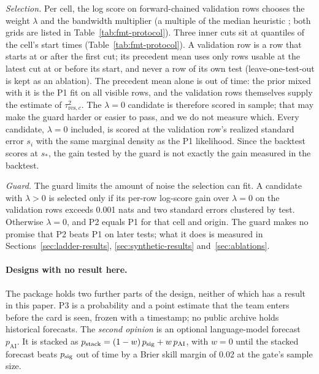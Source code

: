 \emph{Selection.} Per cell, the log score on forward-chained validation rows chooses the weight $\lambda$ and the bandwidth multiplier (a multiple of the median heuristic \cite{garreau2017large}; both grids are listed in Table~\ref{tab:fmt-protocol}). Three inner cuts sit at quantiles of the cell's start times (Table~\ref{tab:fmt-protocol}). A validation row is a row that starts at or after the first cut; its precedent mean uses only rows usable at the latest cut at or before its start, and never a row of its own test (leave-one-test-out is kept as an ablation). The precedent mean alone is out of time: the prior mixed with it is the P1 fit on all visible rows, and the validation rows themselves supply the estimate of $\tau_{\mathrm{res},c}^2$. The $\lambda = 0$ candidate is therefore scored in sample; that may make the guard harder or easier to pass, and we do not measure which. Every candidate, $\lambda = 0$ included, is scored at the validation row's realized standard error $s_i$ with the same marginal density as the P1 likelihood. Since the backtest scores at $s_\ast$, the gain tested by the guard is not exactly the gain measured in the backtest.

\emph{Guard.} The guard limits the amount of noise the selection can fit. A candidate with $\lambda > 0$ is selected only if its per-row log-score gain over $\lambda = 0$ on the validation rows exceeds 0.001 nats and two standard errors clustered by test. Otherwise $\lambda = 0$, and P2 equals P1 for that cell and origin. The guard makes no promise that P2 beats P1 on later tests; what it does is measured in Sections~\ref{sec:ladder-results}, \ref{sec:synthetic-results} and~\ref{sec:ablations}.



\paragraph{Designs with no result here.}\label{sec:no-result} The package holds two further parts of the design, neither of which has a result in this paper. P3 is a probability and a point estimate that the team enters before the card is seen, frozen with a timestamp; no public archive holds historical forecasts. The \emph{second opinion} is an optional language-model forecast $p_{\mathrm{AI}}$. It is stacked as $p_{\mathrm{stack}} = (1 - w)\, p_{\mathrm{sig}} + w\, p_{\mathrm{AI}}$, with $w = 0$ until the stacked forecast beats $p_{\mathrm{sig}}$ out of time by a Brier skill margin of 0.02 at the gate's sample size.

